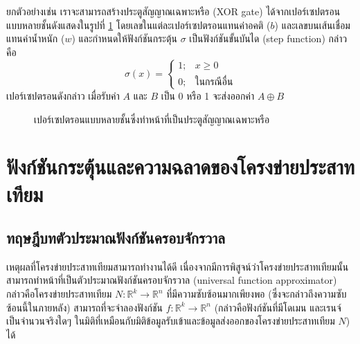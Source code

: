 \documentclass{cpereport}
\begin{document}
ยกตัวอย่างเช่น เราจะสามารถสร้างประตูสัญญาณเฉพาะหรือ (XOR gate) ได้จากเปอร์เซปตรอนแบบหลายชั้นดังแสดงในรูปที่ \ref{xor-mlp} โดยเลขในแต่ละเปอร์เซปตรอนแทนค่าอคติ ($b$) และเลขบนเส้นเชื่อมแทนค่าน้ำหนัก ($w$) และกำหนดให้ฟังก์ชันกระตุ้น $\sigma$ เป็นฟังก์ชันขั้นบันได (step function) กล่าวคือ
\begin{equation*}
    \sigma(x) =
    \begin{cases}
        1; & x \geq 0\\
        0; & \textrm{ในกรณีอื่น}
    \end{cases}
\end{equation*}
เปอร์เซปตรอนดังกล่าว เมื่อรับค่า $A$ และ $B$ เป็น 0 หรือ 1 จะส่งออกค่า $A \oplus B$

\begin{figure}
    \def\layersep{2.5cm}
    \centering
    \caption{เปอร์เซปตรอนแบบหลายชั้นซึ่งทำหน้าที่เป็นประตูสัญญาณเฉพาะหรือ}
    \label{xor-mlp}
\end{figure}

\section{ฟังก์ชันกระตุ้นและความฉลาดของโครงข่ายประสาทเทียม}
\subsection{ทฤษฎีบทตัวประมาณฟังก์ชันครอบจักรวาล}
เหตุผลที่โครงข่ายประสาทเทียมสามารถทำงานได้ดี เนื่องจากมีการพิสูจน์ว่าโครงข่ายประสาทเทียมนั้นสามารถทำหน้าที่เป็นตัวประมาณฟังก์ชันครอบจักรวาล \cite{hornik_1991} (universal function approximator) กล่าวคือโครงข่ายประสาทเทียม $N: \mathbb{R} ^k \rightarrow \mathbb{R} ^n$ ที่มีความซับซ้อนมากเพียงพอ (ซึ่งจะกล่าวถึงความซับซ้อนนี้ในภายหลัง) สามารถที่จะจำลองฟังก์ชัน $f: \mathbb{R}^k \rightarrow \mathbb{R}^n$ (กล่าวคือฟังก์ชันที่มีโดเมน และเรนจ์ เป็นจำนวนจริงใดๆ ในมิติที่เหมือนกับมิติข้อมูลรับเข้าและข้อมูลส่งออกของโครงข่ายประสาทเทียม $N$) ได้ \cite{Cybenko1989} \cite{Leshno1993} \cite{1910.03344}
\end{document}
